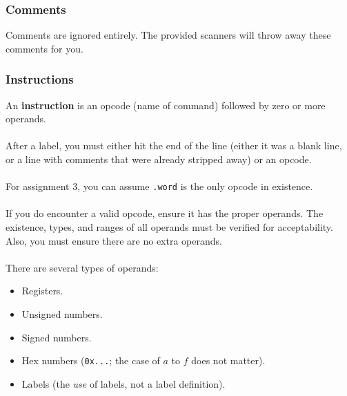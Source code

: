 \documentclass[]{article}
\theoremstyle{definition}
\begin{document}
			\subsubsection{Comments}
				Comments are ignored entirely. The provided scanners will throw away these comments for you.
			\subsubsection{Instructions}
				An \textbf{instruction} is an opcode (name of command) followed by zero or more operands.
				\\ \\
				After a label, you must either hit the end of the line (either it was a blank line, or a line with comments that were already stripped away) or an opcode.
				\\ \\
				For assignment 3, you can assume \verb+.word+ is the only opcode in existence.
				\\ \\
				If you do encounter a valid opcode, ensure it has the proper operands. The existence, types, and ranges of all operands must be verified for acceptability. Also, you must ensure there are no extra operands.
				\\ \\
				There are several types of operands:
				\begin{itemize}
					\item Registers.
					\item Unsigned numbers.
					\item Signed numbers.
					\item Hex numbers (\verb+0x...+; the case of $a$ to $f$ does not matter).
					\item Labels (the \emph{use} of labels, not a label definition).
				\end{itemize}
\end{document}
